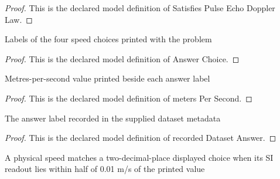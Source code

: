\begin{proof}
  This is the declared model definition of Satisfies Pulse Echo Doppler Law.
\end{proof}
\begin{definition}
  \label{def:physics:phyx-mini-0324:phyxminiproblems-problemphyxmini0324-answerchoice}
  Labels of the four speed choices printed with the problem
\end{definition}
\begin{proof}
  This is the declared model definition of Answer Choice.
\end{proof}
\begin{definition}
  \label{def:physics:phyx-mini-0324:phyxminiproblems-problemphyxmini0324-answerchoice-meterspersecond}
  Metres-per-second value printed beside each answer label
\end{definition}
\begin{proof}
  This is the declared model definition of meters Per Second.
\end{proof}
\begin{definition}
  \label{def:physics:phyx-mini-0324:phyxminiproblems-problemphyxmini0324-recordeddatasetanswer}
  The answer label recorded in the supplied dataset metadata
\end{definition}
\begin{proof}
  This is the declared model definition of recorded Dataset Answer.
\end{proof}
\begin{definition}
  \label{def:physics:phyx-mini-0324:phyxminiproblems-problemphyxmini0324-matchesanswerchoice}
  A physical speed matches a two-decimal-place displayed choice when its SI readout lies within half of 0.01 m/s of the printed value
\end{definition}
